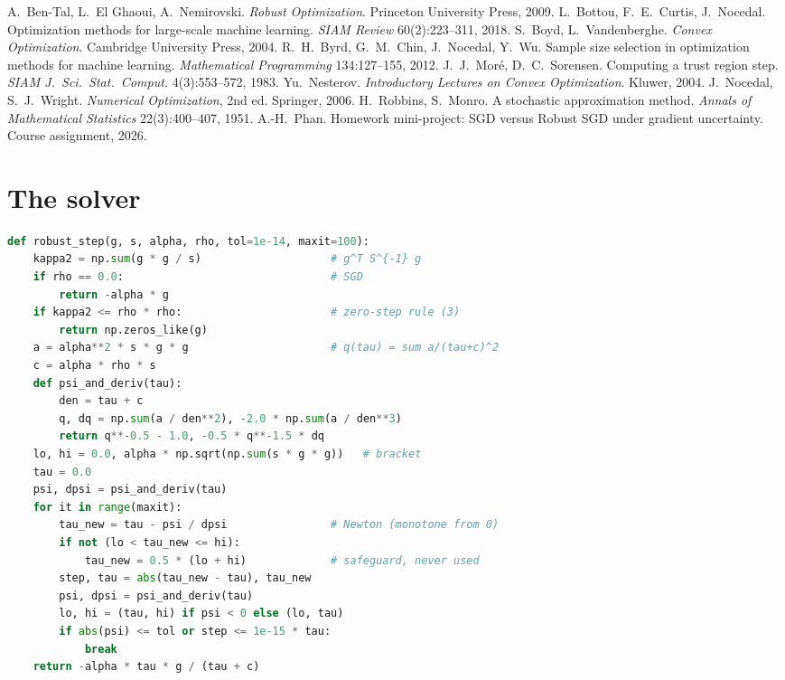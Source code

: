 \documentclass[11pt,a4paper]{article}
\begin{document}
\begin{thebibliography}{9}
 A.~Ben-Tal, L.~El Ghaoui, A.~Nemirovski. \emph{Robust Optimization}. Princeton
University Press, 2009.
 L.~Bottou, F.~E.~Curtis, J.~Nocedal. Optimization methods for large-scale machine
learning. \emph{SIAM Review} 60(2):223--311, 2018.
 S.~Boyd, L.~Vandenberghe. \emph{Convex Optimization}. Cambridge University Press,
2004.
 R.~H.~Byrd, G.~M.~Chin, J.~Nocedal, Y.~Wu. Sample size selection in optimization
methods for machine learning. \emph{Mathematical Programming} 134:127--155, 2012.
 J.~J.~Moré, D.~C.~Sorensen. Computing a trust region step. \emph{SIAM J.\ Sci.\
Stat.\ Comput.} 4(3):553--572, 1983.
 Yu.~Nesterov. \emph{Introductory Lectures on Convex Optimization}. Kluwer, 2004.
\bibitem{nocedal} J.~Nocedal, S.~J.~Wright. \emph{Numerical Optimization}, 2nd ed. Springer, 2006.
\bibitem{robbins} H.~Robbins, S.~Monro. A stochastic approximation method. \emph{Annals of
Mathematical Statistics} 22(3):400--407, 1951.
 A.-H.~Phan. Homework mini-project: SGD versus Robust SGD under gradient uncertainty.
Course assignment, 2026.
\end{thebibliography}

\appendix
\section{The solver}\label{app:solver}
\begin{lstlisting}[language=Python]
def robust_step(g, s, alpha, rho, tol=1e-14, maxit=100):
    kappa2 = np.sum(g * g / s)                    # g^T S^{-1} g
    if rho == 0.0:                                # SGD
        return -alpha * g
    if kappa2 <= rho * rho:                       # zero-step rule (3)
        return np.zeros_like(g)
    a = alpha**2 * s * g * g                      # q(tau) = sum a/(tau+c)^2
    c = alpha * rho * s
    def psi_and_deriv(tau):
        den = tau + c
        q, dq = np.sum(a / den**2), -2.0 * np.sum(a / den**3)
        return q**-0.5 - 1.0, -0.5 * q**-1.5 * dq
    lo, hi = 0.0, alpha * np.sqrt(np.sum(s * g * g))   # bracket
    tau = 0.0
    psi, dpsi = psi_and_deriv(tau)
    for it in range(maxit):
        tau_new = tau - psi / dpsi                # Newton (monotone from 0)
        if not (lo < tau_new <= hi):
            tau_new = 0.5 * (lo + hi)             # safeguard, never used
        step, tau = abs(tau_new - tau), tau_new
        psi, dpsi = psi_and_deriv(tau)
        lo, hi = (tau, hi) if psi < 0 else (lo, tau)
        if abs(psi) <= tol or step <= 1e-15 * tau:
            break
    return -alpha * tau * g / (tau + c)
\end{lstlisting}
\end{document}
